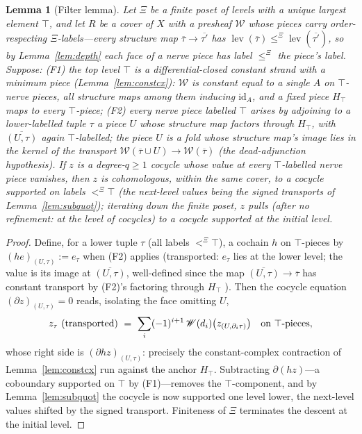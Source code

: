 \documentclass[11pt]{article}
\newtheorem{lemma}[theorem]{Lemma}
\theoremstyle{definition}
\newcommand{\XiLe}{\le^\Xi}
\newcommand{\XiLt}{<^\Xi}
\begin{document}
\begin{lemma}[Filter lemma]\label{lem:filter}
Let $\Xi$ be a finite poset of levels with a unique largest
element $\top$, and let $R$ be a cover of $X$ with a presheaf
$\mathscr W$ whose pieces carry order-respecting
$\Xi$-labels---every structure map
$\overline\tau\to\overline{\tau'}$ has
$\operatorname{lev}(\overline\tau)\XiLe
\operatorname{lev}(\overline{\tau'})$, so by
Lemma~\ref{lem:depth} each face of a nerve piece has label
$\XiLe$ the piece's label. Suppose:
\textup{(}F1\textup{)} the top level $\top$ is a
differential-closed constant strand with a minimum piece
\textup{(}Lemma~\ref{lem:constcx}\textup{)}: $\mathscr W$ is
constant equal to a single $A$ on $\top$-nerve pieces, all
structure maps among them inducing $\mathrm{id}_A$, and a fixed
piece $H_\top$ maps to every $\top$-piece;
\textup{(}F2\textup{)} every nerve piece labelled $\top$ arises
by adjoining to a lower-labelled tuple $\tau$ a piece $U$ whose
structure map factors through $H_\top$, with
$\overline{(U,\tau)}$ again $\top$-labelled; the piece $U$ is a
fold whose structure map's image lies in the kernel of the
transport $\mathscr W(\overline\tau\cup U)\to\mathscr
W(\overline\tau)$ \textup{(}the \emph{dead-adjunction
hypothesis}\textup{)}.
If $z$ is a degree-$q\ge1$ cocycle whose value at every
$\top$-labelled nerve piece vanishes, then $z$ is cohomologous,
within the same cover, to a cocycle supported on labels
$\XiLt\top$ \textup{(}the next-level values being the signed
transports of Lemma~\ref{lem:subquot}\textup{)}; iterating down
the finite poset, $z$ pulls \textup{(}after no refinement: at
the level of cocycles\textup{)} to a cocycle supported at the
initial level.
\end{lemma}

\begin{proof}
Define, for a lower tuple $\tau$ \textup{(}all labels
$\XiLt\top$\textup{)}, a cochain $h$ on $\top$-pieces by
$(he)_{(U,\tau)}:=e_{\tau}$ when (F2) applies
\textup{(}transported: $e_\tau$ lies at the lower level; the
value is its image at $\overline{(U,\tau)}$, well-defined since
the map $\overline{(U,\tau)}\to\overline\tau$ has constant
transport by (F2)'s factoring through $H_\top$
\textup{)}. Then the cocycle equation
$(\partial z)_{(U,\tau)}=0$ reads, isolating the face omitting
$U$,
\[
z_\tau\ \text{\textup{(}transported\textup{)}}\ =\
\sum_{i}(-1)^{i+1}\,\mathscr W(d_i)\bigl(z_{(U,\partial_i\tau)}\bigr)
\quad\text{on }\top\text{-pieces},
\]
whose right side is $(\partial h z)_{(U,\tau)}$: precisely the
constant-complex contraction of Lemma~\ref{lem:constcx} run
against the anchor $H_\top$. Subtracting $\partial(hz)$---a
coboundary supported on $\top$ by (F1)---removes the
$\top$-component, and by Lemma~\ref{lem:subquot} the cocycle is
now supported one level lower, the next-level values shifted by
the signed transport. Finiteness of $\Xi$ terminates the
descent at the initial level.
\end{proof}
\end{document}
